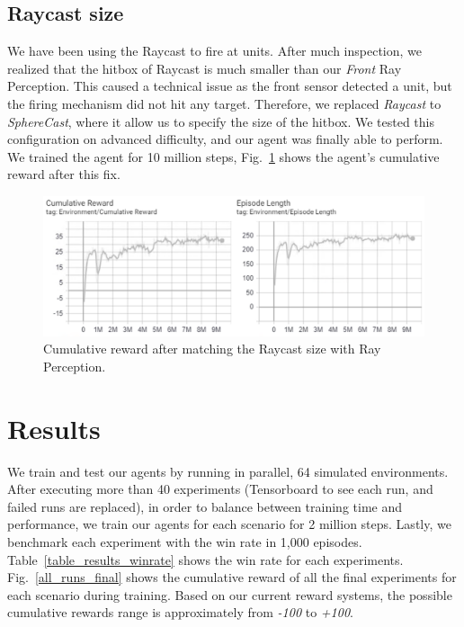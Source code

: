 \documentclass[conference]{IEEEtran}
\begin{document}
\subsection{Raycast size}

We have been using the Raycast to fire at units. After much inspection, we realized that the hitbox of Raycast is much smaller than our \textit{Front} Ray Perception. This caused a technical issue as the front sensor detected a unit, but the firing mechanism did not hit any target. Therefore, we replaced \textit{Raycast} to \textit{SphereCast}, where it allow us to specify the size of the hitbox. We tested this configuration on advanced difficulty, and our agent was finally able to perform. We trained the agent for 10 million steps, Fig.~\ref{run_21} shows the agent's cumulative reward after this fix.

\begin{figure}[ht]
\centerline{\includegraphics[width=1\textwidth]{assets/run_21}}
\caption{Cumulative reward after matching the Raycast size with Ray Perception.}
\label{run_21}
\end{figure}

\section{Results}

We train and test our agents by running in parallel, 64 simulated environments. After executing more than 40 experiments (Tensorboard to see each run, and failed runs are replaced), in order to balance between training time and performance, we train our agents for each scenario for 2 million steps. Lastly, we benchmark each experiment with the win rate in 1,000 episodes. Table~\ref{table_results_winrate} shows the win rate for each experiments. Fig.~\ref{all_runs_final} shows the cumulative reward of all the final experiments for each scenario during training. Based on our current reward systems, the possible cumulative rewards range is approximately from \textit{-100} to \textit{+100}.
\end{document}
